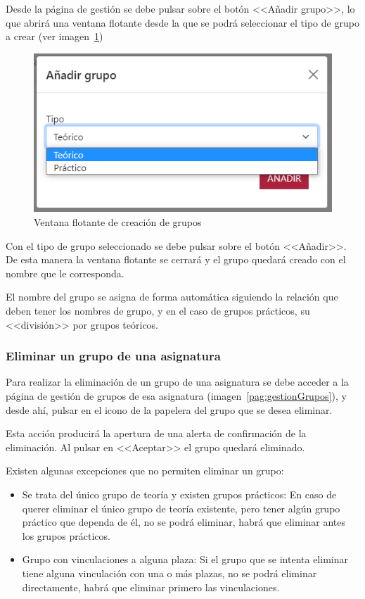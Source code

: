 Desde la página de gestión se debe pulsar sobre el botón <<Añadir grupo>>, lo que abrirá una ventana flotante desde la que se podrá seleccionar el tipo de grupo a crear (ver imagen~\ref{pag:flotanteNuevoGrupo})

\begin{figure}
	\centering
	\includegraphics[width=.8\textwidth]{../img/Anexos/Manual usuario/flotanteNuevoGrupo.png}
	\caption{Ventana flotante de creación de grupos}\label{pag:flotanteNuevoGrupo}
\end{figure}

Con el tipo de grupo seleccionado se debe pulsar sobre el botón <<Añadir>>.
De esta manera la ventana flotante se cerrará y el grupo quedará creado con el nombre que le corresponda.

El nombre del grupo se asigna de forma automática siguiendo la relación que deben tener los nombres de grupo, y en el caso de grupos prácticos, su <<división>> por grupos teóricos.

\subsubsection{Eliminar un grupo de una asignatura}\label{section:eliminarGrupo}
Para realizar la eliminación de un grupo de una asignatura se debe acceder a la página de gestión de grupos de esa asignatura (imagen~\ref{pag:gestionGrupos}), y desde ahí, pulsar en el icono de la papelera del grupo que se desea eliminar.

Esta acción producirá la apertura de una alerta de confirmación de la eliminación.
Al pulsar en <<Aceptar>> el grupo quedará eliminado.

Existen algunas excepciones que no permiten eliminar un grupo:
\begin{itemize}
\item Se trata del único grupo de teoría y existen grupos prácticos:
En caso de querer eliminar el único grupo de teoría existente, pero tener algún grupo práctico que dependa de él, no se podrá eliminar, habrá que eliminar antes los grupos prácticos.
\item Grupo con vinculaciones a alguna plaza:
Si el grupo que se intenta eliminar tiene alguna vinculación con una o más plazas, no se podrá eliminar directamente, habrá que eliminar primero las vinculaciones.
\end{itemize}

